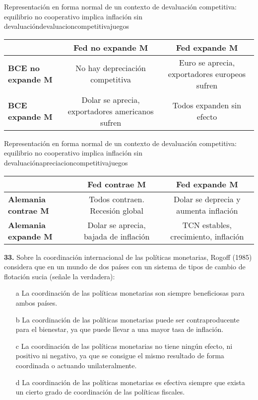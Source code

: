 \documentclass{nuevotema}
\begin{document}
\begin{tabla}{Representación en forma normal de un contexto de devaluación competitiva: equilibrio no cooperativo implica inflación sin devaluación}{devaluacioncompetitivajuegos}
	\begin{tabular}{l || c | c}
		& \textbf{Fed no expande M} & \textbf{Fed expande M} \\ \hline \hline
		\textbf{BCE no expande M} & No hay depreciación competitiva & Euro se aprecia, exportadores europeos sufren  \\ \hline
		\textbf{BCE expande M} & Dolar se aprecia, exportadores americanos sufren & Todos expanden sin efecto \\ \hline
	\end{tabular}
\end{tabla}



\begin{tabla}{Representación en forma normal de un contexto de devaluación competitiva: equilibrio no cooperativo implica inflación sin devaluación}{apreciacioncompetitivajuegos}
	\begin{tabular}{l || c | c}
		& \textbf{Fed contrae M} & \textbf{Fed expande M} \\ \hline \hline
		\textbf{Alemania contrae M} & Todos contraen. Recesión global & Dolar se deprecia y aumenta inflación \\ \hline
		\textbf{Alemania expande M} & Dolar se aprecia, bajada de inflación & TCN estables, crecimiento, inflación  \\ \hline
	\end{tabular}
\end{tabla}


\preguntas


\textbf{33.} Sobre la coordinación internacional de las políticas monetarias, Rogoff (1985) considera que en un mundo de dos países con un sistema de tipos de cambio de flotación sucia (señale la verdadera):

\begin{itemize}
	\item[a] La coordinación de las políticas monetarias son siempre beneficiosas para ambos países.
	\item[b] La coordinación de las políticas monetarias puede ser contraproducente para el bienestar, ya que puede llevar a una mayor tasa de inflación.
	\item[c] La coordinación de las políticas monetarias no tiene ningún efecto, ni positivo ni negativo, ya que se consigue el mismo resultado de forma coordinada o actuando unilateralmente.
	\item[d] La coordinación de las políticas monetarias es efectiva siempre que exista un cierto grado de coordinación de las políticas fiscales.
\end{itemize}
\end{document}

